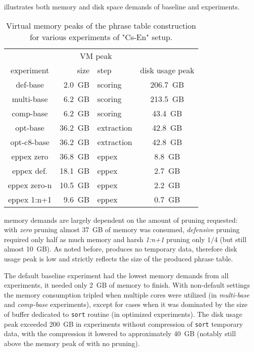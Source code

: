  illustrates both memory and disk space demands of baseline
and \eppex{} experiments.

\begin{table}[ht]
\centering
\begin{tabular}{ | c | r l | c | }
\hline
 & \multicolumn{2}{|c|}{VM peak} & \\
experiment & size & step & disk usage peak \\
\hline
\hline
def-base       &  2.0~GB &    scoring & 206.7~GB \\
multi-base     &  6.2~GB &    scoring & 213.5~GB \\
comp-base      &  6.2~GB &    scoring &  43.4~GB \\
opt-base       & 36.2~GB & extraction &  42.8~GB \\
opt-c8-base    & 36.2~GB & extraction &  42.8~GB \\
eppex zero     & 36.8~GB &      eppex &   8.8~GB \\
\hline
eppex def.     & 18.1~GB &      eppex &   2.7~GB \\
eppex zero-n   & 10.5~GB &      eppex &   2.2~GB \\
eppex 1:n+1    &  9.6~GB &      eppex &   0.7~GB \\
\hline
\end{tabular}
\caption{\label{cs-en-wmt13-vm-and-disk-usage-peaks}Virtual memory peaks of
the phrase table construction for various experiments of "Cs-En" setup.}
\end{table}

\Eppex{} memory demands are largely dependent on the amount of pruning requested: with \emph{zero}
pruning almost 37~GB of memory was consumed, \emph{defensive} pruning required only half as much
memory and harsh \emph{1:n+1} pruning only $1/4$ (but still almost 10~GB).
As noted before, \eppex{} produces no temporary data, therefore disk usage peak is low and strictly
reflects the size of the produced phrase table.

The default baseline experiment had the lowest memory demands from all experiments, it needed only 2~GB
of memory to finish.
With non-default settings the memory consumption tripled when multiple cores were utilized (in \emph{multi-base}
and \emph{comp-base} experiments), except for cases when it was dominated by the size of buffer dedicated
to \texttt{sort} routine (in optimized experiments).
The disk usage peak exceeded 200~GB in experiments without compression of \texttt{sort} temporary data,
with the compression it lowered to approximately 40~GB (notably still above the memory peak of \eppex{}
with no pruning).

